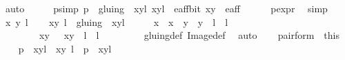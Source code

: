\begin{isabellebody}
\ auto\isanewline
\ \ \isamarkupfalse%
\ \isamarkupfalse%
\ p{\isacharunderscore}simp{\isacharcolon}\ {\isachardoublequoteopen}p\ {\isacharequal}\ gluing\ {\isacharbackquote}{\isacharbackquote}\ {\isacharbraceleft}{\isacharparenleft}{\isacharparenleft}x{\isacharcomma}y{\isacharparenright}{\isacharcomma}l{\isacharparenright}{\isacharbraceright}{\isachardoublequoteclose}\ {\isachardoublequoteopen}{\isacharparenleft}{\isacharparenleft}x{\isacharcomma}y{\isacharparenright}{\isacharcomma}l{\isacharparenright}\ {\isasymin}\ e{\isacharunderscore}aff{\isacharunderscore}bit{\isachardoublequoteclose}\ {\isachardoublequoteopen}{\isacharparenleft}x{\isacharcomma}y{\isacharparenright}\ {\isasymin}\ e{\isacharunderscore}aff{\isachardoublequoteclose}\isanewline
\ \ \ \ \isamarkupfalse%
\ p{\isacharunderscore}expr\ \isamarkupfalse%
\ simp{\isacharplus}\isanewline
\ \ \isacommand{{\isacharbraceleft}}\isamarkupfalse%
\isamarkupfalse%
\ x{\isacharprime}\ y{\isacharprime}\ l{\isacharprime}\isanewline
\ \ \isamarkupfalse%
\ {\isachardoublequoteopen}{\isacharparenleft}{\isacharparenleft}x{\isacharprime}{\isacharcomma}y{\isacharprime}{\isacharparenright}{\isacharcomma}\ l{\isacharprime}{\isacharparenright}\ {\isasymin}\ gluing\ {\isacharbackquote}{\isacharbackquote}\ {\isacharbraceleft}{\isacharparenleft}{\isacharparenleft}x{\isacharcomma}y{\isacharparenright}{\isacharcomma}l{\isacharparenright}{\isacharbraceright}{\isachardoublequoteclose}\isanewline
\ \ \isamarkupfalse%
\ \isamarkupfalse%
\ {\isachardoublequoteopen}{\isacharparenleft}x{\isacharprime}\ {\isacharequal}\ x\ {\isasymand}\ y{\isacharprime}\ {\isacharequal}\ y\ {\isasymand}\ l{\isacharprime}\ {\isacharequal}\ l{\isacharparenright}\ {\isasymor}\isanewline
\ \ \ \ \ \ \ \ {\isacharparenleft}{\isacharparenleft}x{\isacharprime}{\isacharcomma}y{\isacharprime}{\isacharparenright}\ {\isacharequal}\ {\isasymtau}\ {\isacharparenleft}x{\isacharcomma}y{\isacharparenright}\ {\isasymand}\ l{\isacharprime}\ {\isacharequal}\ l\ {\isacharplus}\ {}{\isacharparenright}{\isachardoublequoteclose}\ \isanewline
\ \ \ \ \isamarkupfalse%
\ gluing{\isacharunderscore}def\ Image{\isacharunderscore}def\ \isamarkupfalse%
\ auto\isacommand{{\isacharbraceright}}\isamarkupfalse%
\isanewline
\ \ \isamarkupfalse%
\ pair{\isacharunderscore}form\ {\isacharequal}\ this\isanewline
\ \ \isamarkupfalse%
\ {\isachardoublequoteopen}p\ {\isacharequal}\ {\isacharbraceleft}{\isacharparenleft}{\isacharparenleft}x{\isacharcomma}y{\isacharparenright}{\isacharcomma}l{\isacharparenright}{\isacharcomma}\ {\isacharparenleft}{\isasymtau}\ {\isacharparenleft}x{\isacharcomma}y{\isacharparenright}{\isacharcomma}\ l{\isacharplus}{}{\isacharparenright}{\isacharbraceright}\ {\isasymor}\ p\ {\isacharequal}\ {\isacharbraceleft}{\isacharparenleft}{\isacharparenleft}x{\isacharcomma}y{\isacharparenright}{\isacharcomma}l{\isacharparenright}{\isacharbraceright}{\isachardoublequoteclose}\ \isanewline

\end{isabellebody}
